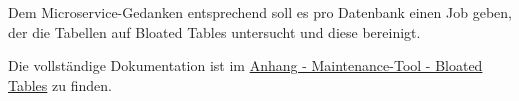 \begin{flushleft}
    Dem Microservice-Gedanken entsprechend soll es pro Datenbank einen Job geben,\\
    der die Tabellen auf Bloated Tables untersucht und diese bereinigt.
\end{flushleft}
\begin{flushleft}
    Die vollständige Dokumentation ist im \hyperref[subsec:maintenance_bloated_tables]{Anhang - Maintenance-Tool - Bloated Tables} zu finden.
\end{flushleft}